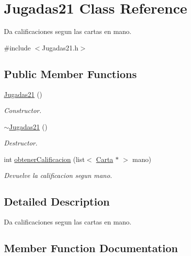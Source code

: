 \hypertarget{class_jugadas21}{}\section{Jugadas21 Class Reference}
\label{class_jugadas21}


Da calificaciones segun las cartas en mano.  




{\ttfamily \#include $<$Jugadas21.\+h$>$}

\subsection*{Public Member Functions}
\begin{DoxyCompactItemize}
\item 
\hyperlink{class_jugadas21_a6b8beb81593cd510ddd0213a7d67bee5}{Jugadas21} ()\hypertarget{class_jugadas21_a6b8beb81593cd510ddd0213a7d67bee5}{}\label{class_jugadas21_a6b8beb81593cd510ddd0213a7d67bee5}

\begin{DoxyCompactList}\small\item\em Constructor. \end{DoxyCompactList}\item 
\hyperlink{class_jugadas21_a979c05f8a3ea4fb7a53443d64ea951d7}{$\sim$\+Jugadas21} ()\hypertarget{class_jugadas21_a979c05f8a3ea4fb7a53443d64ea951d7}{}\label{class_jugadas21_a979c05f8a3ea4fb7a53443d64ea951d7}

\begin{DoxyCompactList}\small\item\em Destructor. \end{DoxyCompactList}\item 
int \hyperlink{class_jugadas21_a40752229af4e2c9e5a6a50d234226abd}{obtener\+Calificacion} (list$<$ \hyperlink{class_carta}{Carta} $\ast$ $>$ mano)
\begin{DoxyCompactList}\small\item\em Devuelve la calificacion segun mano. \end{DoxyCompactList}\end{DoxyCompactItemize}


\subsection{Detailed Description}
Da calificaciones segun las cartas en mano. 

\subsection{Member Function Documentation}
